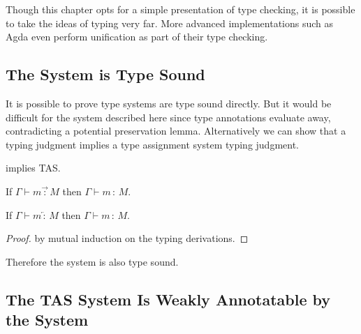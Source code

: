 
Though this chapter opts for a simple presentation of \bidir{} type checking, it is possible to take the ideas of \bidir{} typing very far.
More advanced \bidir{} implementations such as Agda\cite{norell2007towards} even perform unification as part of their \bidir{} type checking.

\subsection{The \Bidir{} System is Type Sound}
 
It is possible to prove \bidir{} type systems are type sound directly\cite{nanevski2005dependent}.
But it would be difficult for the system described here since type annotations evaluate away, contradicting a potential preservation lemma.
Alternatively we can show that a \bidir{} typing judgment implies a type assignment system typing judgment.
 
\begin{thm} \Bidir{} implies \ac{TAS}.
 
If $\Gamma\vdash m\overrightarrow{\,:\,}M$ then $\Gamma\vdash m\,:\,M$.
 
If $\Gamma\vdash m\overleftarrow{\,:\,}M$ then $\Gamma\vdash m\,:\,M$.
\end{thm}
 
\begin{proof}
by mutual induction on the \bidir{} typing derivations.
\end{proof}
Therefore the \bidir{} system is also type sound.
 
\subsection{The \ac{TAS} System Is Weakly Annotatable by the \Bidir{} System}
 
